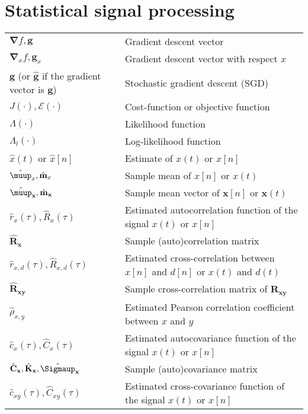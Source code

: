 \documentclass{article}
\begin{document}
\section{Statistical signal processing}
\begin{xltabular}{\textwidth}{XX}
    \(\boldsymbol{\nabla}f, \mathbf{g}\) & Gradient descent vector \\
    \(\boldsymbol{\nabla}_{x}f, \mathbf{g}_{x}\) & Gradient descent vector with respect \(x\)\\
    \(\mathbf{g}\) (or \(\hat{\mathbf{g}}\) if the gradient vector is \(\mathbf{g}\)) & Stochastic gradient descent (SGD) \\
    \(J(\cdot), \mathcal{E}(\cdot)\) & Cost-function or objective function\\
    \(\Lambda(\cdot)\) & Likelihood function\\
    \(\Lambda_l(\cdot)\) & Log-likelihood function\\
    \(\hat{x}(t)\) or \(\hat{x}[n]\) & Estimate of \(x(t)\) or \(x[n]\)\\
    \(\hat{\boldsymbol{\muup}}_x, \hat{\mathbf{m}}_x\) & Sample mean of \(x[n]\) or \(x(t)\) \\
    \(\hat{\boldsymbol{\muup}}_\mathbf{x}, \hat{\mathbf{m}}_\mathbf{x}\) & Sample mean vector of \(\mathbf{x}[n]\) or \(\mathbf{x}(t)\)\\
    \(\hat{r}_x(\tau), \hat{R}_x(\tau)\) & Estimated autocorrelation function of the signal \(x(t)\) or \(x[n]\)\\
    \(\hat{\mathbf{R}}_\mathbf{x}\) & Sample (auto)correlation matrix \\
    \(\hat{r}_{x,d}(\tau), \hat{R}_{x,d}(\tau)\) & Estimated cross-correlation between \(x[n]\) and \(d[n]\) or \(x(t)\) and \(d(t)\)\\
    \(\hat{\mathbf{R}}_\mathbf{xy}\) & Sample cross-correlation matrix of \(\mathbf{R}_\mathbf{xy}\) \\
    \(\hat{\rho}_{x,y}\) & Estimated Pearson correlation coefficient between \(x\) and \(y\)\\
    \(\hat{c}_x(\tau), \hat{C}_x(\tau)\) & Estimated autocovariance function of the signal \(x(t)\) or \(x[n]\)\\
    \(\hat{\mathbf{C}}_\mathbf{x}, \hat{\mathbf{K}}_\mathbf{x}, \hat{\boldsymbol{\Sigmaup}}_\mathbf{x}\) & Sample (auto)covariance matrix \\
    \(\hat{c}_{xy}(\tau), \hat{C}_{xy}(\tau)\) & Estimated cross-covariance function of the signal \(x(t)\) or \(x[n]\)\\

\end{xltabular}
\end{document}
